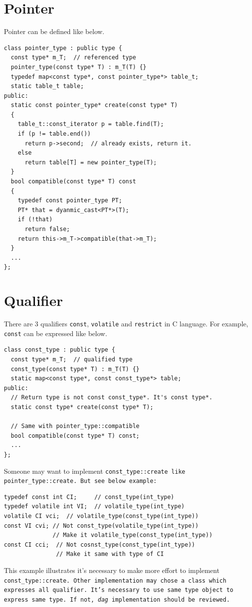 \section{Pointer}
\label{type_e003}
Pointer can be defined like below.
\begin{verbatim}
class pointer_type : public type {
  const type* m_T;  // referenced type
  pointer_type(const type* T) : m_T(T) {}
  typedef map<const type*, const pointer_type*> table_t;
  static table_t table;
public:
  static const pointer_type* create(const type* T)
  {
    table_t::const_iterator p = table.find(T);
    if (p != table.end())
      return p->second;  // already exists, return it.
    else
      return table[T] = new pointer_type(T);
  }
  bool compatible(const type* T) const
  {
    typedef const pointer_type PT;
    PT* that = dyanmic_cast<PT*>(T);
    if (!that)
      return false;
    return this->m_T->compatible(that->m_T);
  }
  ...
};
\end{verbatim}

\section{Qualifier}
\label{type_e002}
There are 3 qualifiers {\tt{const}}, {\tt{volatile}} and {\tt{restrict}}
in C language.
For example, {\tt{const}} can be expressed like below.
\begin{verbatim}
class const_type : public type {
  const type* m_T;  // qualified type
  const_type(const type* T) : m_T(T) {}
  static map<const type*, const const_type*> table;
public:
  // Return type is not const const_type*. It's const type*.
  static const type* create(const type* T);

  // Same with pointer_type::compatible
  bool compatible(const type* T) const;
  ...
};
\end{verbatim}
Someone may want to implement \tt{const\_type::create}
like {\tt{pointer\_type::create}}. But see below example:
\begin{verbatim}
typedef const int CI;     // const_type(int_type)
typedef volatile int VI;  // volatile_type(int_type)
volatile CI vci;  // volatile_type(const_type(int_type))
const VI cvi; // Not const_type(volatile_type(int_type))
              // Make it volatile_type(const_type(int_type))
const CI cci;  // Not cosnst_type(const_type(int_type))
               // Make it same with type of CI
\end{verbatim}
This example illustrates it's necessary to make more effort
to implement \tt{const\_type::create}. Other implementation
may chose a class which expresses all qualifier. It's necessary
to use same type object to express same type. If not,
{\it dag} implementation should be reviewed.

